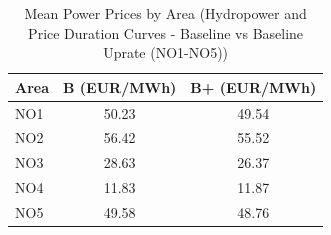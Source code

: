 \begin{table}[htbp]
\centering
\caption{Mean Power Prices by Area (Hydropower and Price Duration Curves - Baseline vs Baseline Uprate (NO1-NO5))}
\label{tab:mean_prices_NO_areas_baseline_vs_uprate}
\begin{tabular}{lcc}
\hline
Area & B (EUR/MWh) & B+ (EUR/MWh) \\
\hline
NO1 & 50.23 & 49.54 \\
NO2 & 56.42 & 55.52 \\
NO3 & 28.63 & 26.37 \\
NO4 & 11.83 & 11.87 \\
NO5 & 49.58 & 48.76 \\
\hline
\end{tabular}
\end{table}